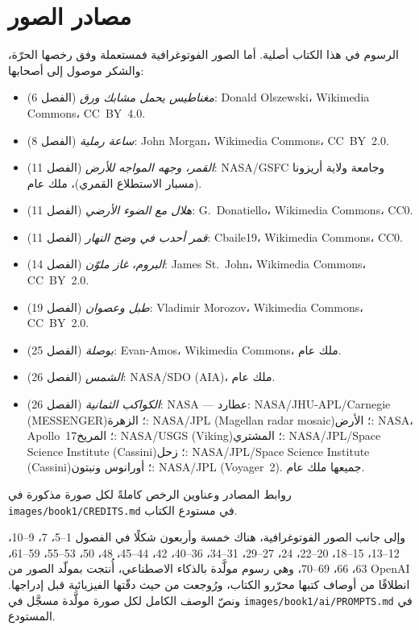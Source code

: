 \chapter*{مصادر الصور}

الرسوم في هذا الكتاب أصلية. أما الصور الفوتوغرافية فمستعملة وفق
رخصها الحرّة، والشكر موصول إلى أصحابها:

\begin{itemize}
  \item \emph{مغناطيس يحمل مشابك ورق} (الفصل 6): Donald
        Olszewski، Wikimedia Commons، CC~BY~4.0.
  \item \emph{ساعة رملية} (الفصل 8): John Morgan، Wikimedia
        Commons، CC~BY~2.0.
  \item \emph{القمر، وجهه المواجه للأرض} (الفصل 11): NASA/GSFC
        وجامعة ولاية أريزونا (مسبار الاستطلاع القمري)، ملك
        عام.
  \item \emph{هلال مع الضوء الأرضي} (الفصل 11):
        G.~Donatiello، Wikimedia Commons، CC0.
  \item \emph{قمر أحدب في وضح النهار} (الفصل 11): Cbaile19،
        Wikimedia Commons، CC0.
  \item \emph{البروم، غاز ملوّن} (الفصل 14): James
        St.~John، Wikimedia Commons، CC~BY~2.0.
  \item \emph{طبل وعصوان} (الفصل 19): Vladimir Morozov،
        Wikimedia Commons، CC~BY~2.0.
  \item \emph{بوصلة} (الفصل 25): Evan-Amos، Wikimedia Commons،
        ملك عام.
  \item \emph{الشمس} (الفصل 26): NASA/SDO (AIA)، ملك
        عام.
  \item \emph{الكواكب الثمانية} (الفصل 26): NASA ---
        عطارد: NASA/JHU-APL/Carnegie (MESSENGER)؛ الزهرة:
        NASA/JPL (Magellan radar mosaic)؛ الأرض: NASA، Apollo~17؛
        المريخ: NASA/USGS (Viking)؛ المشتري: NASA/JPL/Space Science
        Institute (Cassini)؛ زحل: NASA/JPL/Space Science
        Institute (Cassini)؛ أورانوس ونبتون: NASA/JPL
        (Voyager~2). جميعها ملك عام.
\end{itemize}

روابط المصادر وعناوين الرخص كاملةً لكل صورة مذكورة
في \texttt{images/book1/CREDITS.md} في مستودع الكتاب.

\bigskip
وإلى جانب الصور الفوتوغرافية، هناك خمسة وأربعون شكلًا في الفصول
1--5، 7، 9--10، 12--13، 15--18، 20--22، 24، 27--29، 31--34،
36--40، 42، 44--45، 48، 50، 53--55، 59--61، 63، 66، 69--70، وهي رسوم
مولَّدة بالذكاء الاصطناعي، أُنتجت بمولّد الصور من OpenAI انطلاقًا من
أوصاف كتبها محرّرو الكتاب، ورُوجعت من حيث دقّتها الفيزيائية قبل
إدراجها. ونصّ الوصف الكامل لكل صورة مولَّدة مسجَّل في
\texttt{images/book1/ai/PROMPTS.md} في المستودع.
\clearpage
